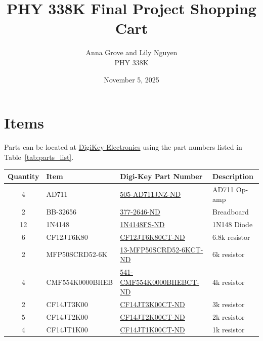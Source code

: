 \documentclass[11pt]{article}
\title{PHY 338K Final Project Shopping Cart}
\author{Anna Grove and Lily Nguyen \\ PHY 338K}
\date{November 5, 2025}
\begin{document}
\maketitle

\section{Items}

\noindent Parts can be located at \href{https://www.digikey.com/}{DigiKey Electronics} using the part numbers listed in Table~\ref{tab:parts_list}.

\begin{table}[H]
    \centering
    \begin{tabular}{|c|l|l|l|}
        \hline
        \textbf{Quantity} & \textbf{Item} & \textbf{Digi-Key Part Number} & \textbf{Description} \\
        \hline
        4 & AD711 & \href{https://www.digikey.com/en/products/detail/analog-devices-inc/AD711JNZ/671001}{505-AD711JNZ-ND} & AD711 Op-amp \\
        2 & BB-32656 &  \href{https://www.digikey.com/en/products/detail/bud-industries/BB-32656/8602381}{377-2646-ND} & Breadboard \\
        12 & 1N4148 & \href{https://www.digikey.com/en/products/detail/onsemi/1N4148/458603}{1N4148FS-ND} & 1N148 Diode \\
        6 & CF12JT6K80 & \href{https://www.digikey.com/en/products/detail/stackpole-electronics-inc/CF12JT6K80/1741188}{CF12JT6K80CT-ND} & 6.8k resistor\\
        2 & MFP50SCRD52-6K & \href{https://www.digikey.com/en/products/detail/yageo/MFP50SCRD52-6K/9128900}{13-MFP50SCRD52-6KCT-ND} & 6k resistor\\
        4 & CMF554K0000BHEB & \href{https://www.digikey.com/en/products/detail/vishay-dale/CMF554K0000BHEB/3634188}{541-CMF554K0000BHEBCT-ND} & 4k resistor\\
        2 & CF14JT3K00 & \href{https://www.digikey.com/en/products/detail/stackpole-electronics-inc/CF14JT3K00/1741418}{CF14JT3K00CT-ND} & 3k resistor\\
        5 & CF14JT2K00 & \href{https://www.digikey.com/en/products/detail/stackpole-electronics-inc/CF14JT2K00/1741368}{CF14JT2K00CT-ND} & 2k resistor\\
        4 & CF14JT1K00 & \href{https://www.digikey.com/en/products/detail/stackpole-electronics-inc/CF14JT1K00/1741314}{CF14JT1K00CT-ND} & 1k resistor\\

\end{tabular}
\end{table}
\end{document}
